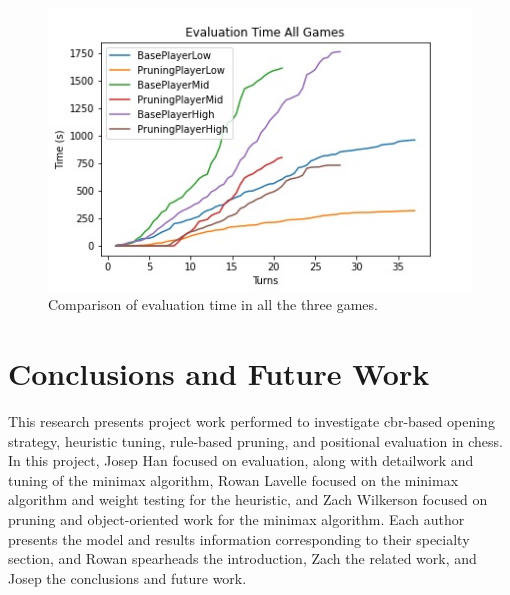 \documentclass[letterpaper]{article}
\begin{document}
\begin{figure}
    \center

    \includegraphics[scale = 0.9]{all_game_time.jpg}
  
    \caption{Comparison of evaluation time in all the three games.} 
\end{figure}
\section{Conclusions and Future Work}
This research presents project work performed to investigate \acrshort{cbr}-based opening strategy, heuristic tuning, rule-based pruning, and positional evaluation in chess.  In this project, Josep Han focused on evaluation, along with detailwork and tuning of the minimax algorithm, Rowan Lavelle focused on the minimax algorithm and weight testing for the heuristic, and Zach Wilkerson focused on pruning and object-oriented work for the minimax algorithm.  Each author presents the model and results information corresponding to their specialty section, and Rowan spearheads the introduction, Zach the related work, and Josep the conclusions and future work.



\end{document}
